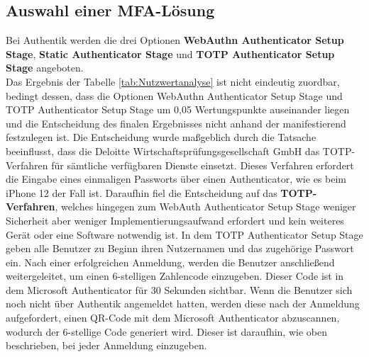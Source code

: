 \subsection{Auswahl einer MFA-Lösung}
\label{sec:Auswahl einer MFA-Lösung}
Bei Authentik werden die drei Optionen \textbf{WebAuthn Authenticator Setup Stage}, \textbf{Static Authenticator Stage} und 
\textbf{\acs{TOTP} Authenticator Setup Stage} angeboten. 
\\Das Ergebnis der Tabelle \ref*{tab:Nutzwertanalyse}  ist nicht eindeutig zuordbar, bedingt dessen, dass 
die Optionen WebAuthn Authenticator Setup Stage und \acs{TOTP} Authenticator Setup Stage um 0,05 Wertungspunkte auseinander liegen und 
die Entscheidung des finalen Ergebnisses nicht anhand der  manifestierend festzulegen ist.
Die Entscheidung wurde maßgeblich durch die Tatsache beeinflusst, dass die Deloitte Wirtschaftsprüfungsgesellschaft GmbH das 
\acs{TOTP}-Verfahren für sämtliche verfügbaren Dienste einsetzt. Dieses Verfahren erfordert die Eingabe eines einmaligen Passworts 
über einen Authenticator, wie es beim iPhone 12 der Fall ist. Daraufhin fiel die Entscheidung auf das \textbf{\acs{TOTP}-Verfahren}, welches 
hingegen zum WebAuth Authenticator Setup Stage weniger Sicherheit aber weniger Implementierungsaufwand erfordert und kein weiteres 
Gerät oder eine Software notwendig ist. 
In dem \acs{TOTP} Authenticator Setup Stage geben alle Benutzer zu Beginn ihren Nutzernamen und das zugehörige Passwort ein. 
Nach einer erfolgreichen Anmeldung, werden die Benutzer anschließend weitergeleitet, um einen 6-stelligen Zahlencode einzugeben.
Dieser Code ist in dem Microsoft Authenticator für 30 Sekunden sichtbar. Wenn die Benutzer sich noch nicht über Authentik angemeldet hatten, 
werden diese nach der Anmeldung aufgefordert, einen QR-Code mit dem Microsoft Authenticator abzuscannen, wodurch der 6-stellige Code generiert wird. 
Dieser ist daraufhin, wie oben beschrieben, bei jeder Anmeldung einzugeben.

